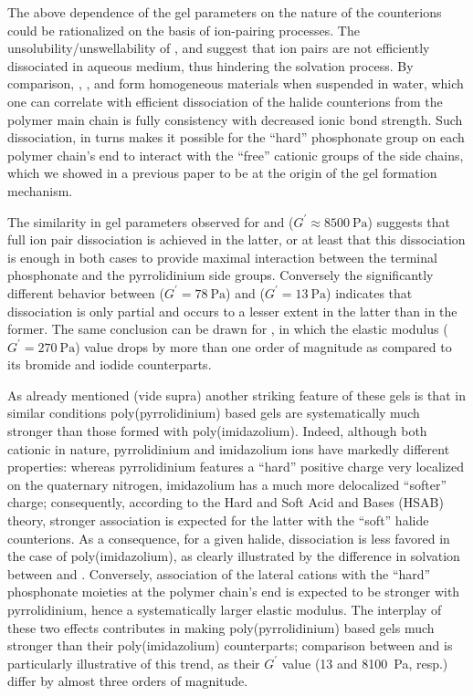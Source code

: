 \documentclass[journal=jacsat,manuscript=article]{achemso}
\begin{document}
The above dependence of the gel parameters on the nature of the counterions could be rationalized on the basis of ion-pairing processes. The unsolubility/unswellability of ,  and  suggest that ion pairs are not efficiently dissociated in aqueous medium, thus hindering the solvation process. By comparison, , ,  and  form homogeneous materials when suspended in water, which one can correlate with efficient dissociation of the halide counterions from the polymer main chain is fully consistency with decreased ionic bond strength. Such dissociation, in turns makes it possible for the ``hard'' phosphonate group on each polymer chain's end to interact with the ``free'' cationic groups of the side chains, which we showed in a previous paper to be at the origin of the gel formation mechanism\cite{Srour2014}.

The similarity in gel parameters observed for  and  ($G^\prime\approx\SI{8500}{\pascal}$) suggests that full ion pair dissociation is achieved in the latter, or at least that this dissociation is enough in both cases to provide maximal interaction between the terminal phosphonate and the pyrrolidinium side groups. Conversely the significantly different behavior between  ($G^\prime= \SI{78}{\pascal}$) and  ($G^\prime= \SI{13}{\pascal}$) indicates that dissociation is only partial and occurs to a lesser extent in the latter than in the former. The same conclusion can be drawn for , in which the elastic modulus ($G^\prime= \SI{270}{\pascal}$) value drops by more than one order of magnitude as compared to its bromide and iodide counterparts.

As already mentioned (vide supra) another striking feature of these gels is that in similar conditions poly(pyrrolidinium) based gels are systematically much stronger than those formed with poly(imidazolium). Indeed, although both cationic in nature, pyrrolidinium and imidazolium ions have markedly different properties: whereas pyrrolidinium features a ``hard'' positive charge very localized on the quaternary nitrogen, imidazolium has a much more delocalized ``softer'' charge; consequently, according to the Hard and Soft Acid and Bases (HSAB) theory, stronger association is expected for the latter with the ``soft'' halide counterions\cite{Goossens2009}. As a consequence, for a given halide, dissociation is less favored in the case of poly(imidazolium), as clearly illustrated by the difference in solvation between  and . Conversely, association of the lateral cations with the ``hard'' phosphonate moieties at the polymer chain’s end is expected to be stronger with pyrrolidinium, hence a systematically larger elastic modulus. The interplay of these two effects contributes in making poly(pyrrolidinium) based gels much stronger than their poly(imidazolium) counterparts; comparison between  and  is particularly illustrative of this trend, as their $G^\prime$ value (13 and \SI{8100}{\pascal}, resp.) differ by almost three orders of magnitude.
\end{document}
